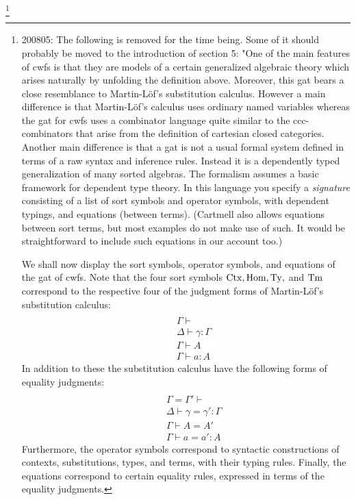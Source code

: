 \documentclass{lmcs}
\def\Ctx{\mathrm{Ctx}}
\def\Hom{\mathrm{Hom}}
\begin{document}
\footnote{200805: The following is removed for the time being. Some of it should probably be moved to the introduction of section 5:
"One of the main features of cwfs is that they are models of a certain generalized algebraic theory which arises naturally by unfolding the definition above. Moreover, this gat bears a close resemblance to Martin-Löf's substitution calculus. However a main difference is that Martin-Löf's calculus uses ordinary named variables whereas the gat for cwfs uses a combinator language quite similar to the ccc-combinators that arise from the definition of cartesian closed categories. Another main difference is that a gat is not a usual formal system defined in terms of a raw syntax and inference rules. Instead it is a dependently typed generalization of many sorted algebras. The formalism assumes a basic framework for dependent type theory. In this language you specify a {\em signature} consisting of a list of sort symbols and operator symbols, with dependent typings, and equations (between terms). (Cartmell \cite{cartmell:phd,cartmell:apal} also allows equations between sort terms, but most examples do not make use of such. It would be straightforward to include such equations in our account too.) 

We shall now display the sort symbols, operator symbols, and equations of the gat of cwfs. Note that the four sort symbols $\Ctx, \Hom, \Ty,$ and $\mathrm{Tm}$ correspond to the respective four of the judgment forms of Martin-Löf's substitution calculus:
\begin{eqnarray*}
\\&&\Gamma \vdash
\\&&\Delta \vdash \gamma : \Gamma
\\&&\Gamma \vdash A
\\&&\Gamma \vdash a : A
\end{eqnarray*}
In addition to these the substitution calculus have the following forms of equality judgments:
\begin{eqnarray*}
\\&&\Gamma = \Gamma' \vdash
\\&&\Delta \vdash \gamma = \gamma' : \Gamma
\\&&\Gamma \vdash A = A'
\\&&\Gamma \vdash a = a' : A
\end{eqnarray*}
Furthermore, the operator symbols correspond to syntactic constructions of contexts, substitutions, types, and terms, with their typing rules. Finally, the equations correspond to certain equality rules, expressed in terms of the equality judgments. 

}
\end{document}
